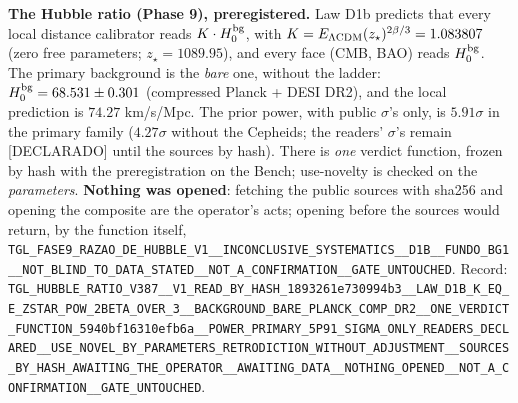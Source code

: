 \documentclass[11pt]{article}
\theoremstyle{definition}\newtheorem{deriv}{Derivation}
\begin{document}
\textbf{The Hubble ratio (Phase 9), preregistered.} Law D1b predicts that every local distance calibrator reads $K\cdot H_0^{\rm bg}$, with $K=E_{\Lambda\rm CDM}(z_\star)^{2\beta/3}=1.083807$ (zero free parameters; $z_\star=1089.95$), and every face (CMB, BAO) reads $H_0^{\rm bg}$. The primary background is the \emph{bare} one, without the ladder: $H_0^{\rm bg}=68.531\pm0.301$ (compressed Planck + DESI DR2), and the local prediction is $74.27$ km/s/Mpc. The prior power, with public $\sigma$'s only, is $5.91\sigma$ in the primary family ($4.27\sigma$ without the Cepheids; the readers' $\sigma$'s remain \textsf{[DECLARADO]} until the sources by hash). There is \emph{one} verdict function, frozen by hash with the preregistration on the Bench; use-novelty is checked on the \emph{parameters}. \textbf{Nothing was opened}: fetching the public sources with sha256 and opening the composite are the operator's acts; opening before the sources would return, by the function itself, \texttt{TGL\_\allowbreak{}FASE9\_\allowbreak{}RAZAO\_\allowbreak{}DE\_\allowbreak{}HUBBLE\_\allowbreak{}V1\_\allowbreak{}\_\allowbreak{}INCONCLUSIVE\_\allowbreak{}SYSTEMATICS\_\allowbreak{}\_\allowbreak{}D1B\_\allowbreak{}\_\allowbreak{}FUNDO\_\allowbreak{}BG1\_\allowbreak{}\_\allowbreak{}NOT\_\allowbreak{}BLIND\_\allowbreak{}TO\_\allowbreak{}DATA\_\allowbreak{}STATED\_\allowbreak{}\_\allowbreak{}NOT\_\allowbreak{}A\_\allowbreak{}CONFIRMATION\_\allowbreak{}\_\allowbreak{}GATE\_\allowbreak{}UNTOUCHED}. Record: \texttt{TGL\_\allowbreak{}HUBBLE\_\allowbreak{}RATIO\_\allowbreak{}V387\_\allowbreak{}\_\allowbreak{}V1\_\allowbreak{}READ\_\allowbreak{}BY\_\allowbreak{}HASH\_\allowbreak{}1893261e730994b3\_\allowbreak{}\_\allowbreak{}LAW\_\allowbreak{}D1B\_\allowbreak{}K\_\allowbreak{}EQ\_\allowbreak{}E\_\allowbreak{}ZSTAR\_\allowbreak{}POW\_\allowbreak{}2BETA\_\allowbreak{}OVER\_\allowbreak{}3\_\allowbreak{}\_\allowbreak{}BACKGROUND\_\allowbreak{}BARE\_\allowbreak{}PLANCK\_\allowbreak{}COMP\_\allowbreak{}DR2\_\allowbreak{}\_\allowbreak{}ONE\_\allowbreak{}VERDICT\_\allowbreak{}FUNCTION\_\allowbreak{}5940bf16310efb6a\_\allowbreak{}\_\allowbreak{}POWER\_\allowbreak{}PRIMARY\_\allowbreak{}5P91\_\allowbreak{}SIGMA\_\allowbreak{}ONLY\_\allowbreak{}READERS\_\allowbreak{}DECLARED\_\allowbreak{}\_\allowbreak{}USE\_\allowbreak{}NOVEL\_\allowbreak{}BY\_\allowbreak{}PARAMETERS\_\allowbreak{}RETRODICTION\_\allowbreak{}WITHOUT\_\allowbreak{}ADJUSTMENT\_\allowbreak{}\_\allowbreak{}SOURCES\_\allowbreak{}BY\_\allowbreak{}HASH\_\allowbreak{}AWAITING\_\allowbreak{}THE\_\allowbreak{}OPERATOR\_\allowbreak{}\_\allowbreak{}AWAITING\_\allowbreak{}DATA\_\allowbreak{}\_\allowbreak{}NOTHING\_\allowbreak{}OPENED\_\allowbreak{}\_\allowbreak{}NOT\_\allowbreak{}A\_\allowbreak{}CONFIRMATION\_\allowbreak{}\_\allowbreak{}GATE\_\allowbreak{}UNTOUCHED}.
\end{document}
